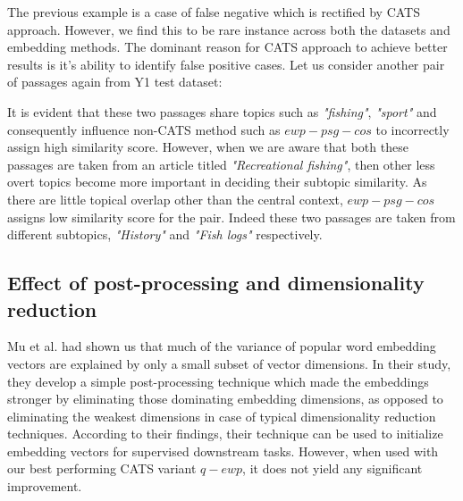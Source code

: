 The previous example is a case of false negative which is rectified by CATS approach. However, we find this to be rare instance across both the datasets and embedding methods. The dominant reason for CATS approach to achieve better results is it's ability to identify false positive cases. Let us consider another pair of passages again from Y1 test dataset:

\noindent{}

It is evident that these two passages share topics such as \textit{"fishing"}, \textit{"sport"} and consequently influence non-CATS method such as $ewp-psg-cos$ to incorrectly assign high similarity score. However, when we are aware that both these passages are taken from an article titled \textit{"Recreational fishing"}, then other less overt topics become more important in deciding their subtopic similarity. As there are little topical overlap other than the central context, $ewp-psg-cos$ assigns low similarity score for the pair. Indeed these two passages are taken from different subtopics, \textit{"History"} and \textit{"Fish logs"} respectively. 

\subsection{Effect of post-processing and dimensionality reduction} Mu et al. had shown us that much of the variance of popular word embedding vectors are explained by only a small subset of vector dimensions. In their study, they develop a simple post-processing technique which made the embeddings stronger by eliminating those dominating embedding dimensions, as opposed to eliminating the weakest dimensions in case of typical dimensionality reduction techniques. According to their findings, their technique can be used to initialize embedding vectors for supervised downstream tasks. However, when used with our best performing CATS variant $q-ewp$, it does not yield any significant improvement.

